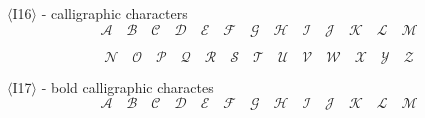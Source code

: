 \documentclass{book}
\begin{document}

$\langle$I16$\rangle$ - calligraphic characters
$$\mathcal{A}\quad \mathcal{B}\quad \mathcal{C}\quad \mathcal{D}\quad
	\mathcal{E}\quad \mathcal{F}\quad \mathcal{G}\quad \mathcal{H}\quad
	\mathcal{I}\quad \mathcal{J}\quad \mathcal{K}\quad \mathcal{L}\quad
	\mathcal{M}$$

$$\mathcal{N}\quad \mathcal{O}\quad \mathcal{P}\quad
	\mathcal{Q}\quad \mathcal{R}\quad \mathcal{S}\quad \mathcal{T}\quad
	\mathcal{U}\quad \mathcal{V}\quad \mathcal{W}\quad \mathcal{X}\quad
	\mathcal{Y}\quad \mathcal{Z}$$

$\langle$I17$\rangle$ - bold calligraphic charactes
$$\mathbf{\mathcal{A}}\quad \mathbf{\mathcal{B}}\quad \mathbf{\mathcal{C}}\quad \mathbf{\mathcal{D}}\quad
	\mathbf{\mathcal{E}}\quad \mathbf{\mathcal{F}}\quad \mathbf{\mathcal{G}}\quad \mathbf{\mathcal{H}}\quad
	\mathbf{\mathcal{I}}\quad \mathbf{\mathcal{J}}\quad \mathbf{\mathcal{K}}\quad \mathbf{\mathcal{L}}\quad
	\mathbf{\mathcal{M}}$$
\end{document}
